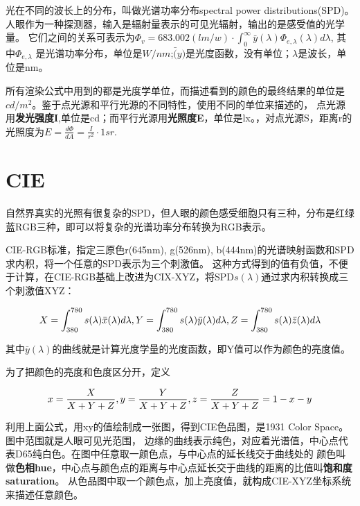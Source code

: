 光在不同的波长上的分布，叫做光谱功率分布spectral power distributions(SPD)。人眼作为一种探测器，输入是辐射量表示的可见光辐射，输出的是感受值的光学量。
它们之间的关系可表示为$\Phi_{v}=683.002(lm/w) \cdot \int_{0}^{\infty}{\bar{y}(\lambda)\Phi_{e,\lambda}(\lambda)d\lambda}$, 其中$\Phi_{e,\lambda}$
是光谱功率分布，单位是$W/nm$;$\bar(y)$是光度函数，没有单位；$\lambda$是波长，单位是nm。

所有渲染公式中用到的都是光度学单位，而描述看到的颜色的最终结果的单位是$cd/m^2$。鉴于点光源和平行光源的不同特性，使用不同的单位来描述的，
点光源用\textbf{发光强度I},单位是cd；而平行光源用\textbf{光照度E}，单位是lx。，对点光源S，距离r的光照度为$E=\frac{d\Phi}{dA}=\frac{I}{r^2} \cdot 1sr$.

\section{CIE}

自然界真实的光照有很复杂的SPD，但人眼的颜色感受细胞只有三种，分布是红绿蓝RGB三种，即可以将复杂的光谱功率分布转换为RGB表示。

CIE-RGB标准，指定三原色r(645nm), g(526nm), b(444nm)的光谱映射函数和SPD求内积，将一个任意的SPD表示为三个刺激值。
这种方式得到的值有负值，不便于计算，在CIE-RGB基础上改进为CIX-XYZ，将SPD$s(\lambda)$通过求内积转换成三个刺激值XYZ：

\begin{align*}
    X = \int_{380}^{780}s(\lambda)\bar{x}(\lambda)d\lambda, \newline
    Y = \int_{380}^{780}s(\lambda)\bar{y}(\lambda)d\lambda, \newline
    Z = \int_{380}^{780}s(\lambda)\bar{z}(\lambda)d\lambda
\end{align*}

其中$\bar{y}(\lambda)$的曲线就是计算光度学量的光度函数，即Y值可以作为颜色的亮度值。

为了把颜色的亮度和色度区分开，定义

\begin{align*}
    x = \frac{X}{X+Y+Z}, \newline
    y = \frac{Y}{X+Y+Z}, \newline
    z = \frac{Z}{X+Y+Z} = 1 -x - y
\end{align*}

利用上面公式，用xy的值绘制成一张图，得到CIE色品图，是1931 Color Space。图中范围就是人眼可见光范围，
边缘的曲线表示纯色，对应着光谱值，中心点代表D65纯白色。在图中任意取一颜色点，与中心点的延长线交于曲线处的
颜色叫做\textbf{色相hue}，中心点与颜色点的距离与中心点延长交于曲线的距离的比值叫\textbf{饱和度saturation}。
从色品图中取一个颜色点，加上亮度值，就构成CIE-XYZ坐标系统来描述任意颜色。

